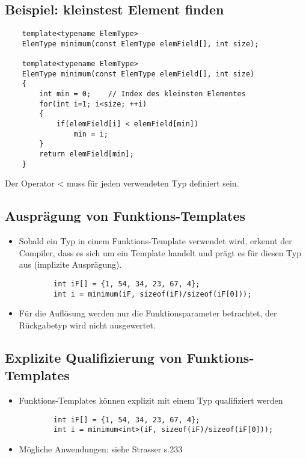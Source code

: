 \subsection{Beispiel: kleinstest Element finden}
\label{sec:Beispiel: kleinstest Element finden}
\noindent
\begin{minipage}{\linewidth}
	\begin{lstlisting}
	template<typename ElemType>
	ElemType minimum(const ElemType elemField[], int size);
	
	template<typename ElemType>
	ElemType minimum(const ElemType elemField[], int size)
	{
		int min = 0;	// Index des kleinsten Elementes
		for(int i=1; i<size; ++i)
		{
			if(elemField[i] < elemField[min])
				min = i;
		}
		return elemField[min];
	}
	\end{lstlisting}
\end{minipage}
\begin{achtung}
Der Operator < muss für jeden verwendeten Typ definiert sein.
\end{achtung}

\subsection{Ausprägung von Funktions-Templates}
\label{sec:Auspraegung von Funktions-Templates}
\begin{itemize}
	\item Sobald ein Typ in einem Funktions-Template verwendet wird, erkennt der Compiler, dass es sich um ein Template handelt und prägt es für diesen Typ aus (implizite Ausprägung).
	\noindent
	\begin{minipage}{\linewidth}
		\begin{lstlisting}
		int iF[] = {1, 54, 34, 23, 67, 4};
		int i = minimum(iF, sizeof(iF)/sizeof(iF[0]));
		\end{lstlisting}
	\end{minipage}
	\item Für die Auflösung werden nur die Funktionsparameter betrachtet, der Rückgabetyp wird nicht ausgewertet.
\end{itemize}

\subsection{Explizite Qualifizierung von Funktions-Templates}
\label{sec:Explizite Qualifizierung von Funktions-Templates}
\begin{itemize}
	\item Funktions-Templates können explizit mit einem Typ qualifiziert werden
	\noindent
	\begin{minipage}{\linewidth}
		\begin{lstlisting}
		int iF[] = {1, 54, 34, 23, 67, 4};
		int i = minimum<int>(iF, sizeof(iF)/sizeof(iF[0]));
		\end{lstlisting}
	\end{minipage}
	\item Mögliche Anwendungen: siehe Strasser s.233
\end{itemize}

